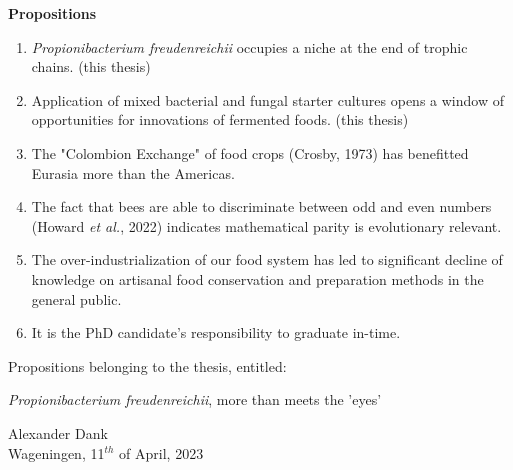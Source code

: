 
%

\thispagestyle{empty}

%

\thispagestyle{empty}
\begin{center}
\Huge{\textbf{Propositions}} \\
\end{center}
\vspace*{1cm}

\begin{flushleft}
\begin{enumerate}
    \item \textit{Propionibacterium freudenreichii} occupies a niche at the end of trophic chains.
    \newline (this thesis)
    \newline
    \item Application of mixed bacterial and fungal starter cultures opens a window of opportunities for innovations of fermented foods. 
    \newline (this thesis)
    \newline
    \item The "Colombion Exchange" of food crops (Crosby, 1973) has benefitted Eurasia more than the Americas.
    \newline
    \item The fact that bees are able to discriminate between odd and even numbers (Howard \textit{et al.}, 2022) indicates mathematical parity is evolutionary relevant.
    \newline
    \item The over-industrialization of our food system has led to significant decline of knowledge on artisanal food conservation and preparation methods in the general public.
    \newline
    \item It is the PhD candidate's responsibility to graduate in-time.
\end{enumerate}
\vspace*{\fill}

Propositions belonging to the thesis, entitled:
\newline

\textit{Propionibacterium freudenreichii}, more than meets the 'eyes'
\newline

Alexander Dank
              \\
Wageningen, 11$^{th}$ of April, 2023
\end{flushleft}


